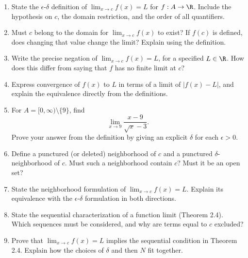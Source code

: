 \begin{enumerate}
  \item State the \(\epsilon\)-\(\delta\) definition of
    \(\lim_{x\to c}f(x)=L\) for \(f:A\to\R\).
    Include the hypothesis on \(c\), the domain restriction, and the
    order of all quantifiers.

  \item Must \(c\) belong to the domain for \(\lim_{x\to c}f(x)\) to
    exist? If \(f(c)\) is defined, does changing that value change the
    limit? Explain using the definition.

  \item Write the precise negation of
    \(\lim_{x\to c}f(x)=L\), for a specified \(L\in\R\).
    How does this differ from saying that \(f\) has no finite limit at \(c\)?

  \item Express convergence of \(f(x)\) to \(L\) in terms of a limit
    of \(|f(x)-L|\), and explain the equivalence directly from the definitions.

  \item For \(A=[0,\infty)\setminus\{9\}\), find
    \[
      \lim_{x\to9}\frac{x-9}{\sqrt{x}-3}.
    \]
    Prove your answer from the definition by giving an explicit
    \(\delta\) for each \(\epsilon>0\).

  \item Define a punctured (or deleted) neighborhood of \(c\) and a
    punctured \(\delta\)-neighborhood of \(c\). Must such a neighborhood
    contain \(c\)? Must it be an open set?

  \item State the neighborhood formulation of \(\lim_{x\to c}f(x)=L\).
    Explain its equivalence with the \(\epsilon\)-\(\delta\) formulation
    in both directions.

  \item State the sequential characterization of a function limit
    (Theorem 2.4). Which sequences must be considered, and why are terms
    equal to \(c\) excluded?

  \item Prove that \(\lim_{x\to c}f(x)=L\) implies the sequential
    condition in Theorem 2.4. Explain how the choices of \(\delta\)
    and then \(N\) fit together.


\end{enumerate}
